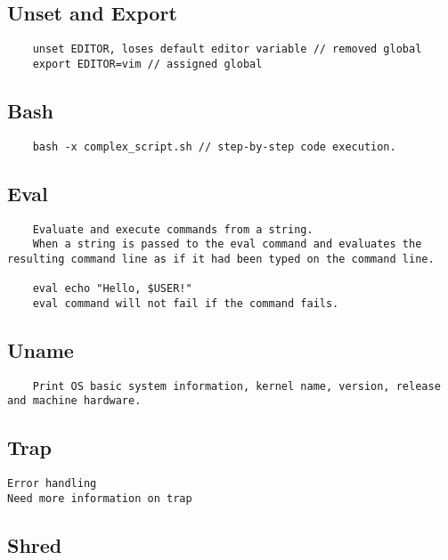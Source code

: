     \subsection{Unset and Export}

    \begin{verbatim}
    unset EDITOR, loses default editor variable // removed global
    export EDITOR=vim // assigned global
    \end{verbatim}

    \subsection{Bash}
    \begin{verbatim}
    bash -x complex_script.sh // step-by-step code execution. 
    \end{verbatim}

    \subsection{Eval}

\begin{verbatim}
    Evaluate and execute commands from a string. 
    When a string is passed to the eval command and evaluates the resulting command line as if it had been typed on the command line.

    eval echo "Hello, $USER!"
    eval command will not fail if the command fails.  
\end{verbatim}

\subsection{Uname}

\begin{verbatim}
    Print OS basic system information, kernel name, version, release and machine hardware. 
\end{verbatim}
\subsection{Trap}

\begin{verbatim}
Error handling
Need more information on trap
\end{verbatim}
\subsection{Shred}
\begin{verbatim}
\end{verbatim}

